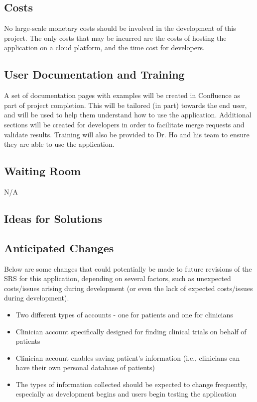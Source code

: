 \documentclass[12pt, titlepage]{article}
\begin{document}
\subsection{Costs}
No large-scale monetary costs should be involved in the development of this project. 
The only costs that may be incurred are the costs of hosting the application on a cloud platform, 
and the time cost for developers.
\subsection{User Documentation and Training}
A set of documentation pages with examples will be created in Confluence as part of project completion.
This will be tailored (in part) towards the end user, and will be used to help 
them understand how to use the application. 
Additional sections will be created for developers in order to facilitate merge requests and validate results.
Training will also be provided to Dr. Ho and his team to ensure they are able to use the application.
\subsection{Waiting Room}

N/A

\subsection{Ideas for Solutions}

\subsection{Anticipated Changes}

Below are some changes that could potentially be made to future 
revisions of the SRS for this application, depending on several factors,
such as unexpected costs/issues arising during development (or even the lack 
of expected costs/issues during development).

\begin{itemize}
    \item Two different types of accounts - one for patients and one for clinicians
    \item Clinician account specifically designed for finding clinical trials on behalf of patients
    \item Clinician account enables saving patient's information (i.e., clinicians can have their own personal database of patients)
    \item The types of information collected should be expected to change frequently, especially as development begins and users begin testing the application
\end{itemize}
\end{document}
